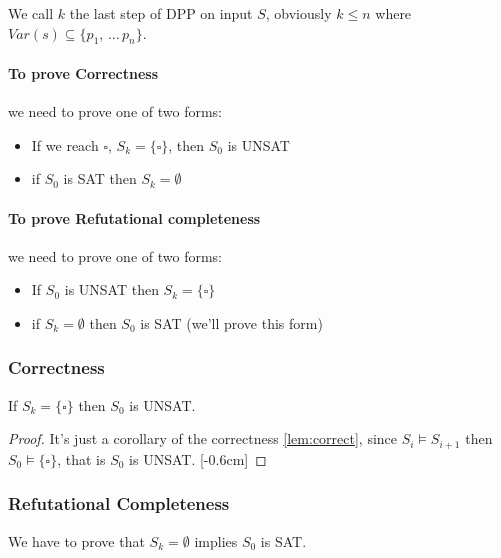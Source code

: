We call $k$ the last step of DPP on input $S$, obviously $k \leq n$ where $Var(s) \subseteq \{p_1 , \, \dots \, p_n\}$.

\paragraph{To prove Correctness} we need to prove one of two forms:
\begin{itemize}
	\item If we reach $\square$, $S_k = \{\square\}$, then $S_0$ is UNSAT
	\item if $S_0$ is SAT then $S_k = \emptyset$
\end{itemize}


\paragraph{To prove Refutational completeness} we need to prove one of two forms:
\begin{itemize}
	\item If $S_0$ is UNSAT then $S_k = \{\square\}$
	\item if $S_k = \emptyset$ then $S_0$ is SAT (we'll prove this form)
\end{itemize}

\subsubsection{Correctness}
If $S_k = \{\square\}$ then $S_0$ is UNSAT.

\begin{proof}
	It's just a corollary of the correctness \cref{lem:correct}, since $S_i \models S_{i+1}$ then $S_0 \models \{\square\}$, that is $S_0$ is UNSAT. [-0.6cm]
\end{proof}

\subsubsection{Refutational Completeness}
We have to prove that $S_k = \emptyset$ implies $S_0$ is SAT.

